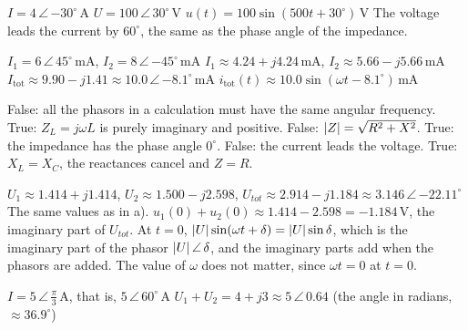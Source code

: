 \begin{facit}
  $I = 4\,\angle\,{-30^{\circ}}\,\text{A}$
 $U = 100\,\angle\,30^{\circ}\,\text{V}$
 $u(t) = 100\sin(500t + 30^{\circ})\,\text{V}$
 The voltage leads the current by $60^{\circ}$, the same as the phase angle of the
impedance.

  $I_1 = 6\,\angle\,45^{\circ}\,\text{mA}$, $I_2 = 8\,\angle\,{-45^{\circ}}\,
\text{mA}$
 $I_1 \approx 4.24 + j4.24\,\text{mA}$, $I_2 \approx 5.66 - j5.66\,\text{mA}$
 $I_{\text{tot}} \approx 9.90 - j1.41 \approx 10.0\,\angle\,{-8.1^{\circ}}\,
\text{mA}$
 $i_{\text{tot}}(t) \approx 10.0\sin(\omega t - 8.1^{\circ})\,\text{mA}$

  False: all the phasors in a calculation must have the same angular frequency.
 True: $Z_L = j\omega L$ is purely imaginary and positive.
 False: $\lvert Z\rvert = \sqrt{R^2 + X^2}$.
 True: the impedance has the phase angle $0^{\circ}$.
 False: the current leads the voltage.
 True: $X_L = X_C$, the reactances cancel and $Z = R$.

  $U_1 \approx 1.414 + j1.414$, $U_2 \approx 1.500 - j2.598$,
$U_{tot} \approx 2.914 - j1.184 \approx 3.146\,\angle\,{-22.11^{\circ}}$
 The same values as in a).
 $u_1(0) + u_2(0) \approx 1.414 - 2.598 = -1.184\,\text{V}$, the imaginary part of
$U_{tot}$. At $t = 0$, $\lvert U\rvert\sin(\omega t + \delta) = \lvert U\rvert\sin\delta$, which is the imaginary
part of the phasor $\lvert U\rvert\,\angle\,\delta$, and the imaginary parts add when the phasors are
added.
The value of $\omega$ does not matter, since $\omega t = 0$ at $t = 0$.

  $I = 5\,\angle\,\frac{\pi}{3}\,\text{A}$, that is,
$5\,\angle\,60^{\circ}\,\text{A}$
 $U_1 + U_2 = 4 + j3 \approx 5\,\angle\,0.64$ (the angle in radians, $\approx 36.9^{\circ}$)

\end{facit}
